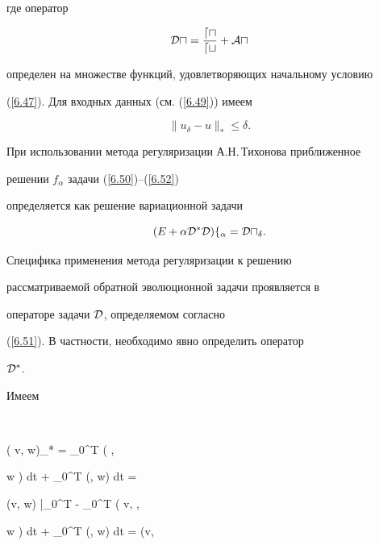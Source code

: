 где оператор


\begin{equation}\label{6.51}


\cal{D} u = \frac{d u}{d t} + \cal{A} u


\end{equation}


определен на множестве функций, удовлетворяющих начальному условию


(\ref{6.47}). Для входных данных (см. (\ref{6.49})) имеем


\begin{equation}\label{6.52}


\|u_{\delta} - u \|_* \le \delta .


\end{equation}








При использовании метода регуляризации А.Н.\,Тихонова приближенное


решении $f_{\alpha}$ задачи (\ref{6.50})--(\ref{6.52})


определяется как решение вариационной задачи


\begin{equation}\label{6.53}


(E + \alpha \cal{D}^{*} \cal{D}) f_{\alpha} =


\cal{D}u_{\delta} .


\end{equation}


Специфика применения метода регуляризации к решению


рассматриваемой обратной эволюционной задачи проявляется в


операторе задачи $\cal{D}$, определяемом согласно


(\ref{6.51}). В частности, необходимо явно определить оператор


$\cal{D}^{*}$.





Имеем


$$


( v, w)_* = \int_0^T \bigg( ,


w \bigg) dt + \int_0^T (, w) dt =


(v, w) \big|_0^T - \int_0^T \bigg( v, ,


w \bigg) dt + \int_0^T (, w) dt = (v, 


